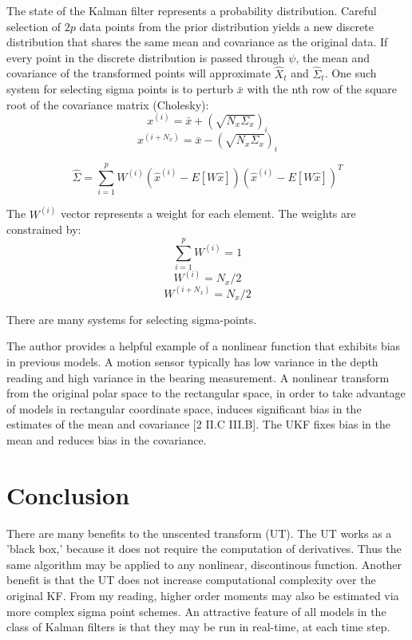 \documentclass{article}
\begin{document}
The state of the Kalman filter represents a probability distribution. Careful selection of $2p$ data points from the prior distribution yields a new discrete distribution that shares the same mean and covariance as the original data. If every point in the discrete distribution is passed through $\psi$, the mean and covariance of the transformed points will approximate $\hat X_t$ and $\hat \Sigma_t$. One such system for selecting sigma points is to perturb $\bar x$ with the nth row of the square root of the covariance matrix (Cholesky):
\[
	x^{(i)} = \bar x + (\sqrt{N_x \Sigma_x})_i
\]
\[
	x^{(i + N_x)} = \bar x - (\sqrt{N_x \Sigma_x})_i
\]

\[
	\hat \Sigma = \sum_{i=1}^{p} W^{(i)}(\hat x^{(i)} - E[W\hat x]) (\hat x^{(i)} - E[W\hat x])^T
\]

The $W^{(i)}$ vector represents a weight for each element. The weights are constrained by:
\[
	\sum^{p}_{i=1} W^{(i)} = 1
\]
\[
	W^{(i)} = N_x / 2
\]
\[
	W^{(i + N_x)} = N_x / 2
\]

There are many systems for selecting sigma-points.

The author provides a helpful example of a nonlinear function that exhibits bias in previous models. A motion sensor typically has low variance in the depth reading and high variance in the bearing measurement. A nonlinear transform from the original polar space to the rectangular space, in order to take advantage of models in rectangular coordinate space, induces significant bias in the estimates of the mean and covariance [2 II.C III.B]. The UKF fixes bias in the mean and reduces bias in the covariance.


\section{Conclusion}

There are many benefits to the unscented transform (UT). The UT works as a 'black box,' because it does not require the computation of derivatives. Thus the same algorithm may be applied to any nonlinear, discontinous function. Another benefit is that the UT does not increase computational complexity over the original KF. From my reading, higher order moments may also be estimated via more complex sigma point schemes. An attractive feature of all models in the class of Kalman filters is that they may be run in real-time, at each time step.
\end{document}

